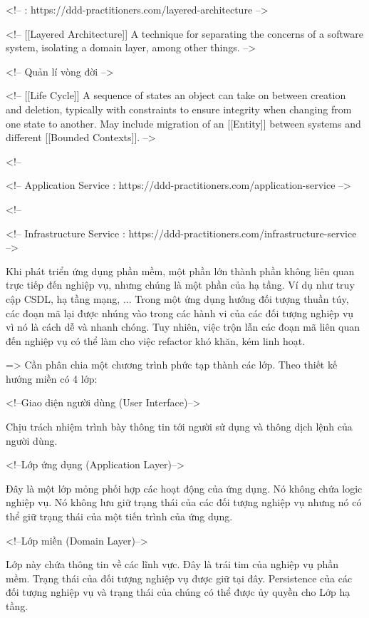 <!--  : https://ddd-practitioners.com/layered-architecture -->

<!-- [[Layered Architecture]] A technique for separating the concerns of a software system, isolating a domain layer, among other things. -->

<!-- Quản lí vòng đời -->

<!-- [[Life Cycle]] A sequence of states an object can take on between creation and deletion, typically with constraints to ensure integrity when changing from one state to another. May include migration of an [[Entity]] between systems and different [[Bounded Contexts]]. -->






<!-- %

<!-- Application Service : https://ddd-practitioners.com/application-service -->

<!-- %

<!-- Infrastructure Service : https://ddd-practitioners.com/infrastructure-service -->





Khi phát triển ứng dụng phần mềm, một phần lớn thành phần không liên quan trực tiếp đến nghiệp vụ, nhưng chúng là một phần của hạ tầng. Ví dụ như truy cập CSDL, hạ tầng mạng, ... Trong một ứng dụng hướng đối tượng thuần túy, các đoạn mã lại được nhúng vào trong các hành vi của các đối tượng nghiệp vụ vì nó là cách dễ và nhanh chóng. Tuy nhiên, việc trộn lẫn các đoạn mã liên quan đến nghiệp vụ có thể làm cho việc refactor khó khăn, kém linh hoạt.

=> Cần phân chia một chương trình phức tạp thành các lớp. Theo thiết kế hướng miền có 4 lớp:

<!--Giao diện người dùng (User Interface)-->

Chịu trách nhiệm trình bày thông tin tới người sử dụng và thông dịch lệnh của người dùng.

<!--Lớp ứng dụng (Application Layer)-->

Đây là một lớp mỏng phối hợp các hoạt động của ứng dụng. Nó không chứa logic nghiệp vụ. Nó không lưu giữ trạng thái của các đối tượng nghiệp vụ nhưng nó có thể giữ trạng thái của một tiến trình của ứng dụng.

<!--Lớp miền (Domain Layer)-->

Lớp này chứa thông tin về các lĩnh vực. Đây là trái tim của nghiệp vụ phần mềm. Trạng thái của đối tượng nghiệp vụ được giữ tại đây. Persistence của các đối tượng nghiệp vụ và trạng thái của chúng có thể được ủy quyền cho Lớp hạ tầng.

